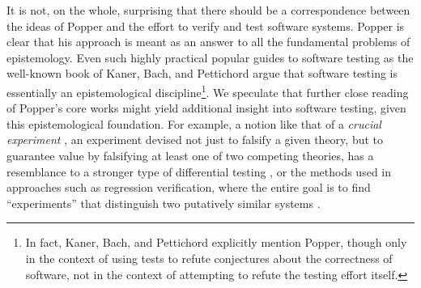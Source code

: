 \documentclass{svjour3}
\begin{document}
It is not, on the whole, surprising that there should be a
correspondence between the ideas of Popper and the effort to verify
and test software systems.  Popper is clear that his approach is meant
as an answer to all the fundamental problems of epistemology.  Even
such highly practical popular guides to software testing as the
well-known book of Kaner, Bach, and Pettichord \cite{kaner} argue that
software testing is essentially an epistemological
discipline\footnote{In fact, Kaner, Bach, and Pettichord explicitly
  mention Popper, though only in the context of using tests to refute
  conjectures about the correctness of software, not in the context of
  attempting to refute the testing effort itself.}.  We speculate that
further close reading of Popper's core works might yield additional
insight into software testing, given this epistemological foundation.
For example, a notion like that of a \emph{crucial experiment}
\cite{Popper}, an experiment
devised not just to falsify a given theory, but to guarantee value by
falsifying at least one of two competing theories, has a resemblance
to a stronger type of differential testing \cite{Differential}, or the
methods used in approaches such as regression verification, where the
entire goal is to find ``experiments'' that distinguish two putatively
similar systems \cite{strichman2008regression}.

\end{document}
